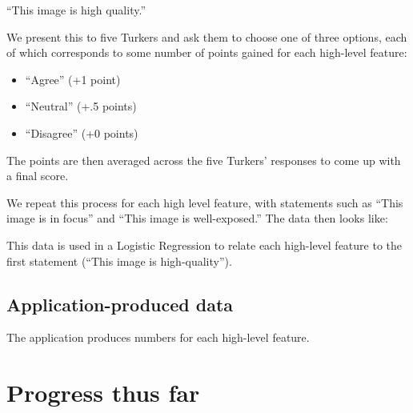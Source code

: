\documentclass[10pt,twocolumn]{article}
\begin{document}
``This image is high quality.''

We present this to five Turkers and ask them to choose one of three options, each of which corresponds to some number of points gained for each high-level feature:

\begin{itemize}
\item ``Agree'' (+1 point)
\item ``Neutral'' (+.5 points)
\item ``Disagree'' (+0 points)
\end{itemize}
The points are then averaged across the five Turkers' responses to come up with a final score.

We repeat this process for each high level feature, with statements such as ``This image is in focus'' and ``This image is well-exposed.'' The data then looks like:


This data is used in a Logistic Regression to relate each high-level feature to the first statement (``This image is high-quality'').

\subsection{Application-produced data}
The application produces numbers for each high-level feature.

\section{Progress thus far}
\end{document}
